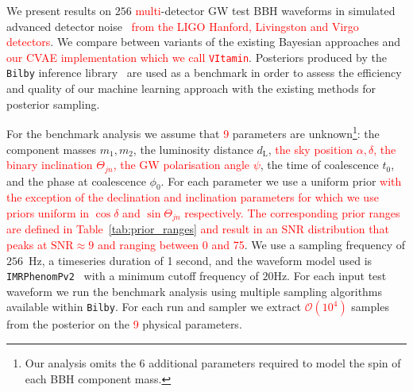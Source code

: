 \documentclass[%
showpacs,
nofootinbib,
 amsmath,amssymb,
 aps,
 twocolumn,
 prl,
 reprint,
floatfix,
]{revtex4-1}
\newcommand{\new}[1]{\textcolor{red}{#1}}
\begin{document}
%
%

%
%
%
%
We present results on $256$ \new{multi}-detector \ac{GW} test \ac{BBH}
waveforms in simulated advanced detector noise~\cite{aligo_noisecurves}
\new{from the LIGO Hanford, Livingston and Virgo detectors}. We compare between
variants of the existing Bayesian approaches and \new{our \ac{CVAE} implementation
which we call \texttt{VItamin}}. Posteriors produced by the \texttt{Bilby}
inference library~\cite{1811.02042} are used as a benchmark in order to assess
the efficiency and quality of our machine learning approach with the existing
methods for posterior sampling.

%
%
For the benchmark analysis we assume that \new{9} parameters are
unknown\footnote{Our analysis omits the 6 additional parameters required to
model the spin of each \ac{BBH} component mass.}: the component masses
$m_1,m_2$, the luminosity distance $d_{\text{L}}$, \new{the sky position
$\alpha,\delta$, the binary inclination $\Theta_{jn}$, the \ac{GW} polarisation
angle ${\psi}$}, the time of coalescence $t_{0}$, and the phase at coalescence
$\phi_0$. For each parameter we use a uniform prior \new{with the exception of
the declination and inclination parameters for which we use priors uniform in
$\cos\delta$ and $\sin\Theta_{jn}$ respectively. The corresponding prior ranges
are defined in Table~\ref{tab:prior_ranges} and result in an \ac{SNR}
distribution that peaks at $\text{SNR}\approx 9$ and ranging between 0 and 75}.
We use a sampling frequency of $256$~Hz, a timeseries duration of 1 second, and
the waveform model used is \texttt{IMRPhenomPv2}~\cite{1809.10113} with a
minimum cutoff frequency of $20$Hz. For each input test waveform we run the
benchmark analysis using multiple sampling algorithms available within
\texttt{Bilby}. For each run and sampler we extract \new{$\mathcal{O}(10^4)$}
samples from the posterior on the \new{9} physical parameters.  
\end{document}
